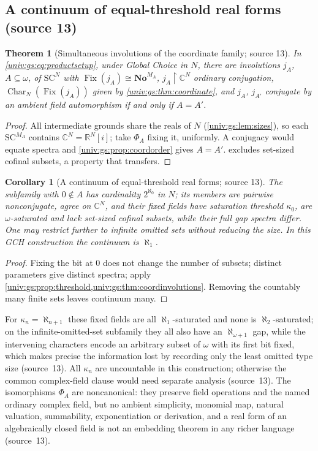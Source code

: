 \documentclass[11pt,letterpaper]{article}
\numberwithin{equation}{section}
\newtheorem{theorem}{Theorem}[section]
\newtheorem{corollary}[corollary]{Corollary}
\theoremstyle{definition}
\theoremstyle{remark}
\newcommand{\No}{\mathbf{No}}
\newcommand{\SC}{\mathrm{SC}}
\newcommand{\SCN}{\SC^{N}}
\newcommand{\R}{\mathbb R}
\newcommand{\C}{\mathbb C}
\newcommand{\Fix}{\operatorname{Fix}}
\newcommand{\res}{\mathbin{\upharpoonright}}
\newcommand{\Char}{\operatorname{Char}}
\begin{document}
\subsection{A continuum of equal-threshold real forms (source 13)}

\begin{theorem}[Simultaneous involutions of the coordinate family; source 13]\label{univ:gs:thm:coordinvolutions}
In \eqref{univ:gs:eq:productsetup}, under Global Choice in $N$, there are involutions $j_A$,
$A\subseteq\omega$, of $\SCN$ with $\Fix(j_A)\cong\No^{M_A}$, $j_A\res\C^N$ ordinary conjugation,
$\Char_N(\Fix(j_A))$ given by \cref{univ:gs:thm:coordinate}, and $j_A$, $j_{A'}$ conjugate by an
ambient field automorphism if and only if $A=A'$.
\end{theorem}
\begin{proof}
All intermediate grounds share the reals of $N$ (\cref{univ:gs:lem:sizes}), so each $\SC^{M_A}$
contains $\C^N=\R^N[i]$; take $\Phi_A$ fixing it, uniformly. A conjugacy would equate spectra and
\cref{univ:gs:prop:coordorder} gives $A=A'$.  excludes set-sized cofinal
subsets, a property that transfers.
\end{proof}

\begin{corollary}[A continuum of equal-threshold real forms; source 13]\label{univ:gs:cor:continuumforms}
The subfamily with $0\notin A$ has cardinality $2^{\aleph_0}$ in $N$; its members are pairwise
nonconjugate, agree on $\C^N$, and their fixed fields have saturation threshold $\kappa_0$, are
$\omega$-saturated and lack set-sized cofinal subsets, while their full gap spectra differ. One may
restrict further to infinite omitted sets without reducing the size. In this GCH construction the
continuum is $\aleph_1$.
\end{corollary}
\begin{proof}
Fixing the bit at $0$ does not change the number of subsets; distinct parameters give distinct
spectra; apply \cref{univ:gs:prop:threshold,univ:gs:thm:coordinvolutions}. Removing the countably
many finite sets leaves continuum many.
\end{proof}

For $\kappa_n=\aleph_{n+1}$ these fixed fields are all $\aleph_1$-saturated and none is
$\aleph_2$-saturated; on the infinite-omitted-set subfamily they all also have an
$\aleph_{\omega+1}$ gap, while the intervening characters encode an arbitrary subset of $\omega$
with its first bit fixed, which makes precise the information lost by recording only the least
omitted type size (source~13). All $\kappa_n$ are uncountable in this construction; otherwise the
common complex-field clause would need separate analysis (source~13). The isomorphisms $\Phi_A$
are noncanonical: they preserve field operations and the named ordinary complex field, but no
ambient simplicity, monomial map, natural valuation, summability, exponentiation or derivation,
and a real form of an algebraically closed field is not an embedding theorem in any richer
language (source~13).
\end{document}
